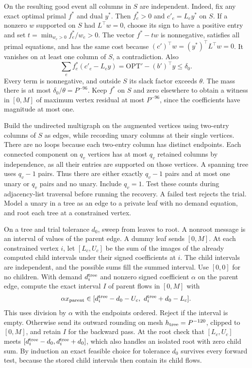 \documentclass[11pt]{article}
\begin{document}
On the resulting good event all columns in \(S\) are independent. Indeed, fix any exact optimal primal \(f^*\) and dual \(y^*\). Then \(f^*_e>0\) and \(c'_e=L_e y^*\) on \(S\). If a nonzero \(w\) supported on \(S\) had \(L^\top w=0\), choose its sign to have a positive entry and set \(t=\min_{w_e>0}f_e^*/w_e>0\). The vector \(f^*-tw\) is nonnegative, satisfies all primal equations, and has the same cost because \((c')^\top w=(y^*)^\top L^\top w=0\). It vanishes on at least one column of \(S\), a contradiction. Also
\[
 \sum_e f_e^*(c'_e-L_e y)=\mathrm{OPT}'-(b')^\top y\le\delta_0 .
\]
Every term is nonnegative, and outside \(S\) its slack factor exceeds \(\theta\). The mass there is at most \(\delta_0/\theta=P^{-96}\). Keep \(f^*\) on \(S\) and zero elsewhere to obtain a witness in \([0,M]\) of maximum vertex residual at most \(P^{-96}\), since the coefficients have magnitude at most one.

Build the undirected multigraph on the augmented vertices using two-entry columns of \(S\) as edges, while recording unary columns at their single vertices. There are no loops because each two-entry column has distinct endpoints. Each connected component on \(q_v\) vertices has at most \(q_v\) retained columns by independence, as all their entries are supported on those vertices. A spanning tree uses \(q_v-1\) pairs. Thus there are either exactly \(q_v-1\) pairs and at most one unary or \(q_v\) pairs and no unary. Include \(q_v=1\). Test these counts during adjacency-list traversal before running the recovery. A failed test rejects the trial. Model a unary in a tree as an edge to a private leaf with no demand equation, and root each tree at a constrained vertex.

On a tree and trial tolerance \(d_0\), sweep from leaves to root. A nonroot message is an interval of values of the parent edge. A dummy leaf sends \([0,M]\). At each constrained vertex \(i\), let \([L_c,U_c]\) be the sum of the images of the already computed child intervals under their signed coefficients at \(i\). The child intervals are independent, and the possible sums fill the summed interval. Use \([0,0]\) for no children. With demand \(d_i^{\rm tree}\) and nonzero signed coefficient \(\alpha\) on the parent edge, compute the exact interval \(I\) of parent flows in \([0,M]\) with
\[
 \alpha x_{\rm parent}\in[d_i^{\rm tree}-d_0-U_c,\ d_i^{\rm tree}+d_0-L_c].
\]
This uses division by \(\alpha\) with the endpoints ordered. Reject if the interval is empty. Otherwise send its outward rounding on mesh \(h_{\rm tree}=P^{-120}\), clipped to \([0,M]\), and retain \(I\) for the backward pass. At the root check that \([L_c,U_c]\) meets \([d_i^{\rm tree}-d_0,d_i^{\rm tree}+d_0]\), which also handles an isolated root with zero child sum. By induction an exact feasible choice for tolerance \(d_0\) survives every forward test, because the stored child intervals then contain its child flows.
\end{document}
